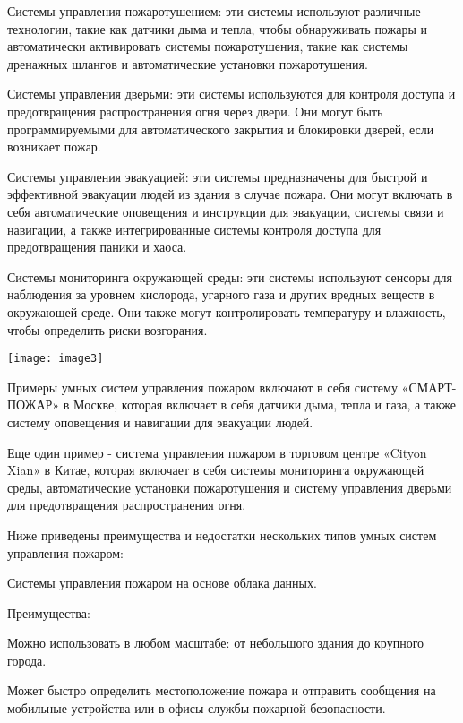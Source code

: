 \begin{multicols}{2}
Системы управления пожаротушением: эти системы используют различные
технологии, такие как датчики дыма и тепла, чтобы обнаруживать пожары
и автоматически активировать системы пожаротушения, такие как системы
дренажных шлангов и автоматические установки пожаротушения.

Системы управления дверьми: эти системы используются для контроля
доступа и предотвращения распространения огня через двери. Они могут
быть программируемыми для автоматического закрытия и блокировки
дверей, если возникает пожар.

Системы управления эвакуацией: эти системы предназначены для быстрой и
эффективной эвакуации людей из здания в случае пожара. Они могут
включать в себя автоматические оповещения и инструкции для эвакуации,
системы связи и навигации, а также интегрированные системы контроля
доступа для предотвращения паники и хаоса.

Системы мониторинга окружающей среды: эти системы используют сенсоры
для наблюдения за уровнем кислорода, угарного газа и других вредных
веществ в окружающей среде. Они также могут контролировать температуру
и влажность, чтобы определить риски возгорания.

\begin{center}
\texttt{[image: image3]}
\end{center}

Примеры умных систем управления пожаром включают в себя систему
«СМАРТ-ПОЖАР» в Москве, которая включает в себя датчики дыма, тепла и
газа, а также систему оповещения и навигации для эвакуации людей.

Еще один пример - система управления пожаром в торговом центре «Cityon
Xi\textquotesingle an» в Китае, которая включает в себя системы
мониторинга окружающей среды, автоматические установки пожаротушения и
систему управления дверьми для предотвращения распространения огня.

Ниже приведены преимущества и недостатки нескольких типов умных систем
управления пожаром:

Системы управления пожаром на основе облака данных.

Преимущества:

Можно использовать в любом масштабе: от небольшого здания до крупного
города.

Может быстро определить местоположение пожара и отправить сообщения на
мобильные устройства или в офисы службы пожарной безопасности.


\end{multicols}
